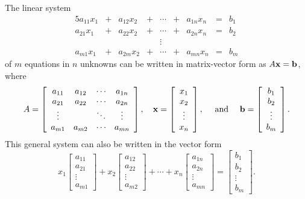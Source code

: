 The linear system
\begin{alignat*}{5}
{a_{11}}x_1 	&{}+{} 	&{a_{12}}x_2 	&{}+{}	&\cdots 			&{}+{}	&{a_{1n}}x_n		&{}={}	&b_1 \\
{a_{21}}x_1 	&{}+{} 	&{a_{22}}x_2		&{}+{}	&\cdots			&{}+{}	&{a_{2n}}x_n		&{}={}	&b_2 \\
{} 				&{} 		&{}					&{}		&\vdots \ \		&{}		&{}					&{}		&{} \\
{a_{m1}}x_1 	&{}+{} 	&{a_{2m}}x_2	&{}+{}	&\cdots			&{}+{}	&{a_{mn}}x_n	&{}={}	&b_m 
\end{alignat*} 
of $m$ equations in $n$ unknowns can be written in matrix-vector form as $A\mathbf{x} = \mathbf{b}$, where 
\[A = \left[ \begin{array}{cccc}
a_{11} & a_{12} & \cdots & a_{1n} \\
a_{21} & a_{22} & \cdots & a_{2n} \\
\vdots &        & \ddots    & \vdots \\
a_{m1} & a_{m2} & \cdots & a_{mn}
\end{array} \right],  \ \ \ \mathbf{x} = \left[ \begin{array}{c} x_1 \\ x_2 \\ \vdots \\ x_n \end{array} \right],  \ \ \ \text{ and } \ \ \ \mathbf{b} = \left[ \begin{array}{c} b_1 \\ b_2 \\ \vdots \\ b_m \end{array} \right].\]
This general system can also be written in the vector form
\[x_1  \left[ \begin{array}{c} a_{11}  \\ a_{21} \\ \vdots \\ a_{m1} \end{array} \right] + x_2 \left[ \begin{array}{c} a_{12}  \\ a_{22} \\ \vdots \\ a_{m2} \end{array} \right]  + \cdots + x_n \left[ \begin{array}{c} a_{1n}  \\ a_{2n}  \\ \vdots \\ a_{mn} \end{array} \right] = \left[ \begin{array}{c} b_1 \\ b_2 \\ \vdots \\ b_m \end{array} \right].\]



